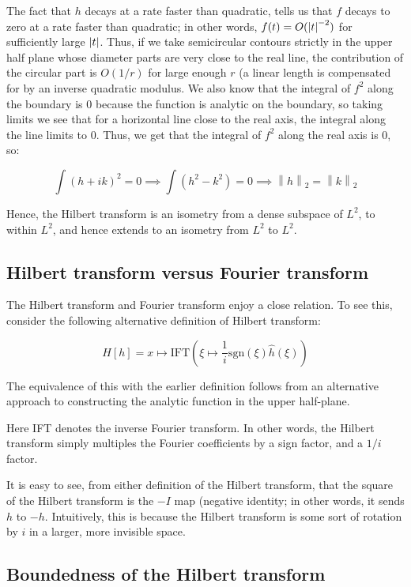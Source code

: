 \documentclass[a4paper]{amsart}
\newcommand{\norm}[1]{\left\|#1\right\|}
\newcommand{\sgn}{\text{sgn}}
\begin{document}
The fact that $h$ decays at a rate faster than quadratic, tells us
that $f$ decays to zero at a rate faster than quadratic; in other
words, $f(t) = O(\left|t\right|^{-2})$ for sufficiently large
$\left|t\right|$. Thus, if we take semicircular contours strictly in the
upper half plane whose diameter parts are very close to the real line,
the contribution of the circular part is $O(1/r)$ for large enough $r$
(a linear length is compensated for by an inverse quadratic
modulus. We also know that the integral of $f^2$ along the boundary is
$0$ because the function is analytic on the boundary, so taking limits
we see that for a horizontal line close to the real axis, the integral
along the line limits to $0$. Thus, we get that the integral of $f^2$
along the real axis is $0$, so:

$$\int (h + ik)^2 = 0 \implies \int (h^2 - k^2) = 0 \implies \norm{h}_2 = \norm{k}_2$$

Hence, the Hilbert transform is an isometry from a dense subspace of
$L^2$, to within $L^2$, and hence extends to an isometry from $L^2$ to
$L^2$.

\subsection{Hilbert transform versus Fourier transform}

The Hilbert transform and Fourier transform enjoy a close relation. To
see this, consider the following alternative definition of Hilbert
transform:

$$H[h] = x \mapsto \text{IFT} \left(\xi \mapsto \frac{1}{i} \sgn(\xi)\hat{h}(\xi)\right)$$

The equivalence of this with the earlier definition follows from an
alternative approach to constructing the analytic function in the
upper half-plane.

Here IFT denotes the inverse Fourier transform. In other words, the
Hilbert transform simply multiples the Fourier coefficients by a sign
factor, and a $1/i$ factor.

It is easy to see, from either definition of the Hilbert transform,
that the square of the Hilbert transform is the $-I$ map (negative
identity; in other words, it sends $h$ to $-h$. Intuitively, this is
because the Hilbert transform is some sort of rotation by $i$ in a
larger, more invisible space.

\subsection{Boundedness of the Hilbert transform}
\end{document}
